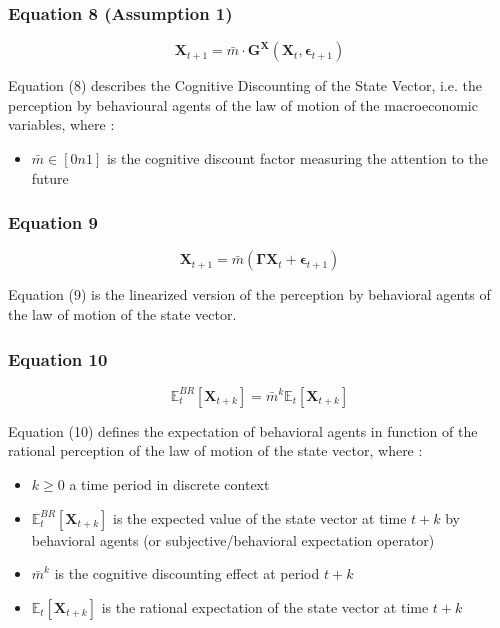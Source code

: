 \documentclass{article}
\begin{document}
\subsubsection*{Equation 8 (Assumption 1)}

\begin{equation}\tag{8}
    \bm{X}_{t+1}=\bar{m}\cdot\bm{G}^{\bm{X}}(\bm{X}_{t},\bm{\epsilon}_{t+1})
\end{equation}

Equation (8) describes the Cognitive Discounting of the State Vector, i.e. the perception by behavioural agents of the law of motion of the macroeconomic variables, where : 
\begin{itemize}
    \item $\bar{m}\in\left[0n1\right]$ is the cognitive discount factor measuring the attention to the future
\end{itemize}

\subsubsection*{Equation 9}

\begin{equation}\tag{9}
    \bm{X}_{t+1}=\bar{m}(\bm{\Gamma}\bm{X}_{t}+\bm{\epsilon}_{t+1})
\end{equation}

Equation (9) is the linearized version of the perception by behavioral agents of the law of motion of the state vector. 

\subsubsection*{Equation 10}

\begin{equation}\tag{10}
    \mathbb{E}_{t}^{BR}\left[\bm{X}_{t+k}\right]=\bar{m}^{k}\mathbb{E}_{t}\left[\bm{X}_{t+k}\right]
\end{equation}

Equation (10) defines the expectation of behavioral agents in function of the rational perception of the law of motion of the state vector, where : 
\begin{itemize}
    \item $k\geq 0$ a time period in discrete context
    \item $\mathbb{E}_{t}^{BR}\left[\bm{X}_{t+k}\right]$ is the expected value of the state vector at time $t+k$ by behavioral agents (or subjective/behavioral expectation operator)
    \item $\bar{m}^{k}$ is the cognitive discounting effect at period $t+k$
    \item $\mathbb{E}_{t}\left[\bm{X}_{t+k}\right]$ is the rational expectation of the state vector at time $t+k$
\end{itemize}
\end{document}

